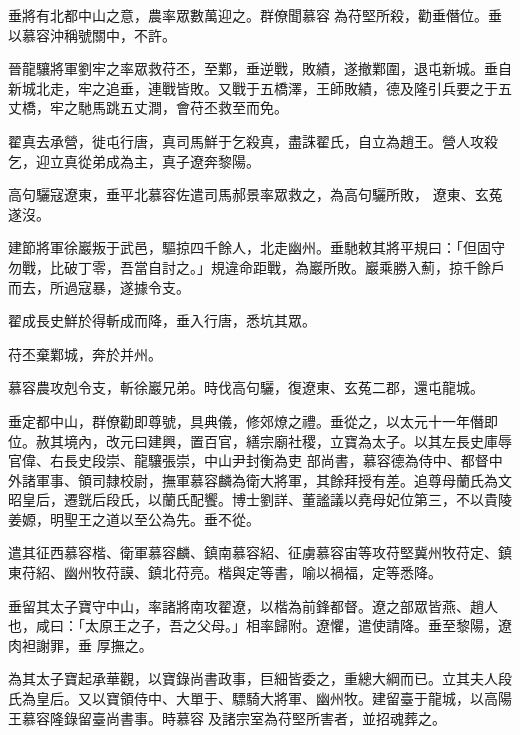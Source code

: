 \begin{pinyinscope}
 垂將有北都中山之意，農率眾數萬迎之。群僚聞慕容為苻堅所殺，勸垂僭位。垂以慕容沖稱號關中，不許。



 晉龍驤將軍劉牢之率眾救苻丕，至鄴，垂逆戰，敗績，遂撤鄴圍，退屯新城。垂自新城北走，牢之追垂，連戰皆敗。又戰于五橋澤，王師敗績，德及隆引兵要之于五丈橋，牢之馳馬跳五丈澗，會苻丕救至而免。



 翟真去承營，徙屯行唐，真司馬鮮于乞殺真，盡誅翟氏，自立為趙王。營人攻殺乞，迎立真從弟成為主，真子遼奔黎陽。



 高句驪寇遼東，垂平北慕容佐遣司馬郝景率眾救之，為高句驪所敗，
 遼東、玄菟遂沒。



 建節將軍徐巖叛于武邑，驅掠四千餘人，北走幽州。垂馳敕其將平規曰：「但固守勿戰，比破丁零，吾當自討之。」規違命距戰，為巖所敗。巖乘勝入薊，掠千餘戶而去，所過寇暴，遂據令支。



 翟成長史鮮於得斬成而降，垂入行唐，悉坑其眾。



 苻丕棄鄴城，奔於并州。



 慕容農攻剋令支，斬徐巖兄弟。時伐高句驪，復遼東、玄菟二郡，還屯龍城。



 垂定都中山，群僚勸即尊號，具典儀，修郊燎之禮。垂從之，以太元十一年僭即位。赦其境內，改元曰建興，置百官，繕宗廟社稷，立寶為太子。以其左長史庫辱官偉、右長史段崇、龍驤張崇，中山尹封衡為吏
 部尚書，慕容德為侍中、都督中外諸軍事、領司隸校尉，撫軍慕容麟為衛大將軍，其餘拜授有差。追尊母蘭氏為文昭皇后，遷皝后段氏，以蘭氏配饗。博士劉詳、董謐議以堯母妃位第三，不以貴陵姜嫄，明聖王之道以至公為先。垂不從。



 遣其征西慕容楷、衛軍慕容麟、鎮南慕容紹、征虜慕容宙等攻苻堅冀州牧苻定、鎮東苻紹、幽州牧苻謨、鎮北苻亮。楷與定等書，喻以禍福，定等悉降。



 垂留其太子寶守中山，率諸將南攻翟遼，以楷為前鋒都督。遼之部眾皆燕、趙人也，咸曰：「太原王之子，吾之父母。」相率歸附。遼懼，遣使請降。垂至黎陽，遼肉袒謝罪，垂
 厚撫之。



 為其太子寶起承華觀，以寶錄尚書政事，巨細皆委之，重總大綱而已。立其夫人段氏為皇后。又以寶領侍中、大單于、驃騎大將軍、幽州牧。建留臺于龍城，以高陽王慕容隆錄留臺尚書事。時慕容及諸宗室為苻堅所害者，並招魂葬之。




\end{pinyinscope}

